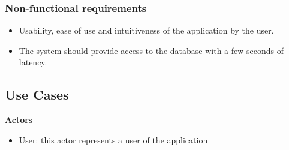 \documentclass[a4paper, oneside]{article}
\begin{document}
\subsubsection{Non-functional requirements}
\begin{itemize}
\item Usability, ease of use and intuitiveness of the application by the user.
\item The system should provide access to the database with a few seconds of latency.
\end{itemize}

\clearpage

\subsection{Use Cases}

\textbf{Actors}
\begin{itemize}
\item{User: this actor represents a user of the application}
\end{itemize}
\end{document}
